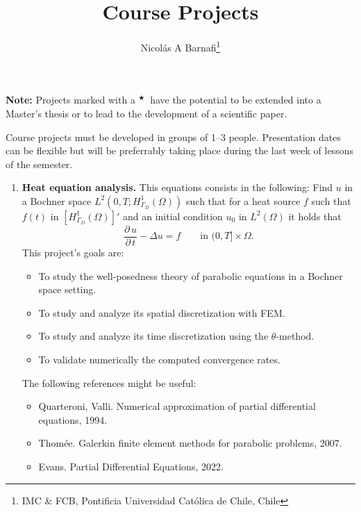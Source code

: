 \documentclass{article}
\title{Course Projects}
\author{Nicol\'as A Barnafi\thanks{IMC \& FCB, Pontificia Universidad Católica de Chile, Chile}}
\date{}
\newcommand{\parder}[2]{\frac{\partial\,#1}{\partial\,#2}}
\newcommand{\master}{$^\bigstar$}
\begin{document}
\maketitle

\noindent\textbf{Note:} Projects marked with a \master\ have the potential to be extended into a Master's thesis or to lead to the development of a scientific paper.

\vspace{0.5cm}

Course projects must be developed in groups of 1--3 people.
Presentation dates can be flexible but will be preferrably taking place during the last week of lessons of the semester.
\begin{enumerate}
    \item \textbf{Heat equation analysis.} This equations consists in the following: Find $u$ in a Bochner space $L^2(0,T;H_{\Gamma_D}^1(\Omega))$ such that for a heat source $f$ such that $f(t)$ in $[H_{\Gamma_D}^1(\Omega)]'$ and an initial condition $u_0$ in $L^2(\Omega)$ it holds that
        $$\parder{u}{t} - \Delta u = f \qquad\text{in $(0,T]\times \Omega$}.$$
        This project's goals are:
        \begin{itemize}
            \item To study the well-posedness theory of parabolic equations in a Bochner space setting.
            \item To study and analyze its spatial discretization with FEM.
            \item To study and analyze its time discretization using the $\theta$-method.
            \item To validate numerically the computed convergence rates.
        \end{itemize}

        The following references might be useful: 
        \begin{itemize}
            \item Quarteroni, Valli. Numerical approximation of partial differential equations, 1994.
            \item Thomée. Galerkin finite element methods for parabolic problems, 2007.
            \item Evans. Partial Differential Equations, 2022.
        \end{itemize}


\end{enumerate}
\end{document}
